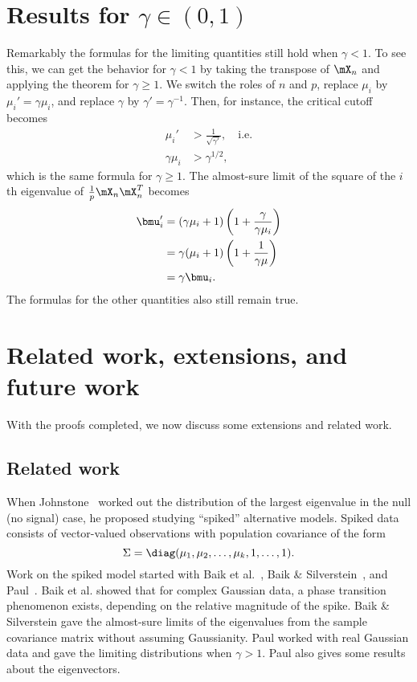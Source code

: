 \section{Results for $\gamma \in (0,1)$}\label{S:lowrank-gamma-lt-1}

Remarkably the formulas for the limiting quantities still hold when $\gamma < 1$.  To see this, we can get the behavior for $\gamma < 1$ by taking the transpose of $\mX_n$ and applying the theorem for $\gamma \geq 1$.  We switch the roles of $n$ and $p$, replace $\mu_i$ by $\mu_i' = \gamma \mu_i$, and replace $\gamma$ by $\gamma' = \gamma^{-1}$.  Then, for instance, the critical cutoff becomes
\begin{align*}
    \mu_i' &> \frac{1}{\sqrt{\gamma'}}, \quad\text{i.e.} \\
    \gamma \mu_i &> \gamma^{1/2},
\end{align*}
which is the same formula for $\gamma \geq 1$.  The almost-sure limit of
the square of the $i$th eigenvalue of $\frac{1}{p} \mX_n \mX_n^T$ becomes
\begin{align*}
    \bmu_i'
        &= ( \gamma \mu_i + 1 )
           \left( 1 + \frac{\gamma}{ \gamma \mu_i } \right) \\
        &= \gamma ( \mu_i + 1 ) \left( 1 + \frac{1}{\gamma \mu} \right) \\
        &= \gamma \bmu_i.
\end{align*}
The formulas for the other quantities also still remain true.

\section{Related work, extensions, and future work}\label{S:lowrank-related-extensions}

With the proofs completed, we now discuss some extensions and related work.

\subsection{Related work}

When Johnstone~\cite{johnstone2001dle} worked out the distribution of the largest eigenvalue in the null (no signal) case, he proposed studying ``spiked'' alternative models.  Spiked data consists of vector-valued observations with population covariance of the form
\[
    \Sigma = \diag( \mu_1, \mu_2, \ldots, \mu_k, 1, \ldots, 1 ).
\]
Work on the spiked model started with Baik et al.~\cite{baik2005ptl}, 
Baik \& Silverstein~\cite{baik2006els}, and Paul~\cite{paul2007ase}.  Baik et al. showed that for complex Gaussian data, a phase transition phenomenon exists, depending on the relative magnitude of the spike.  Baik \& Silverstein gave the almost-sure limits of the eigenvalues from the sample covariance matrix without assuming Gaussianity.  Paul worked with real Gaussian data and gave the limiting distributions when $\gamma > 1$.  Paul also gives some results about the eigenvectors.

